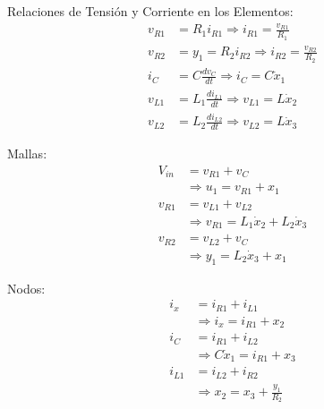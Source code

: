   Relaciones de Tensión y Corriente en los Elementos:
  \begin{align}
    v_{R1} &= R_1 i_{R1} \Rightarrow
    i_{R1} = \frac{v_{R1}}{R_1} \label{eq:1.1:3:vr1}
    \\
    v_{R2} &= y_1 = R_2 i_{R2} \Rightarrow
    i_{R2} = \frac{v_{R2}}{R_2} \label{eq:1.1:3:vr2}
    \\
    i_C &= C \frac{dv_{C}}{dt} \Rightarrow
    i_C =C\dot{x}_1 \label{eq:1.1:3:ic}
    \\
    v_{L1} &= L_1 \frac{di_{L1}}{dt} \Rightarrow
    v_{L1} = L\dot{x}_2 \label{eq:1.1:3:vl1}
    \\
    v_{L2} &= L_2 \frac{di_{L2}}{dt} \Rightarrow
    v_{L2} = L\dot{x}_3 \label{eq:1.1:3:vl2}
  \end{align}

  Mallas:
  \begin{align}
    \label{eq:1.1:3:Malla1}
    V_{in} &= v_{R1} + v_C \nonumber \\
    \tag{Malla 1}
    &\Rightarrow u_1 = v_{R1} + x_1
    \\
    \label{eq:1.1:3:Malla2}
    v_{R1} &= v_{L1} + v_{L2} \nonumber \\
    \tag{Malla 2}
    &\Rightarrow v_{R1} = L_1\dot{x}_2 + L_2\dot{x}_3
    \\
    \label{eq:1.1:3:Malla3}
    v_{R2} &= v_{L2} + v_C \nonumber \\
    \tag{Malla 3}
    &\Rightarrow y_1 = L_2\dot{x}_3 + x_1
  \end{align}

  Nodos:
  \begin{align}
    \label{eq:1.1:3:Nodo1}
    i_x &= i_{R1} + i_{L1} \nonumber \\
    \tag{Nodo 1}
    &\Rightarrow i_x = i_{R1} + x_2
    \\ \label{eq:1.1:3:Nodo2}
    i_C &= i_{R1} + i_{L2} \nonumber \\
    \tag{Nodo 2}
    &\Rightarrow C\dot{x}_1 = i_{R1} + x_3
    \\ \label{eq:1.1:3:Nodovx}
    i_{L1} &= i_{L2} + i_{R2} \nonumber \\
    \tag{Nodo $V_x$}
    &\Rightarrow x_2 = x_3 + \frac{y_1}{R_2}
  \end{align}
